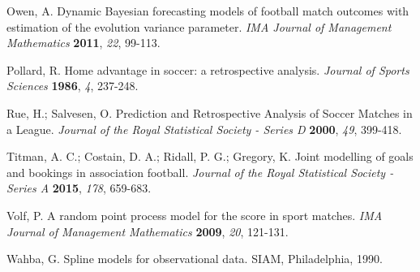 \documentclass[journal,article,accept,moreauthors,pdftex,12pt,a4paper]{mdpi}
\begin{document}
\begin{thebibliography}{999}
		Owen, A. Dynamic Bayesian forecasting models of football match
		outcomes with estimation of the evolution variance parameter. {\em
			IMA Journal of Management Mathematics} {\bf 2011}, {\em 22}, 99-113.
		
		Pollard, R. Home advantage in soccer: a retrospective analysis. {\em Journal of Sports Sciences} {\bf 1986}, {\em 4}, 237-248.
		
		Rue, H.; Salvesen, O. Prediction and Retrospective Analysis of
		Soccer Matches in a League. {\em Journal of the Royal Statistical
			Society - Series D} {\bf 2000}, {\em 49}, 399-418.
		
		Titman, A. C.; Costain, D. A.; Ridall, P. G.; Gregory, K. Joint
		modelling of goals and bookings in association football. {\em
			Journal of the Royal Statistical Society - Series A} {\bf 2015},
		{\em 178}, 659-683.
		
		Volf, P. A random point process model for the score in sport
		matches. {\em IMA Journal of Management Mathematics} {\bf 2009},
		{\em 20}, 121-131.
		
		Wahba, G. Spline models for observational data. SIAM, Philadelphia,
		1990.
		
	\end{thebibliography}
	
	
	
	
	
	
\end{document}
